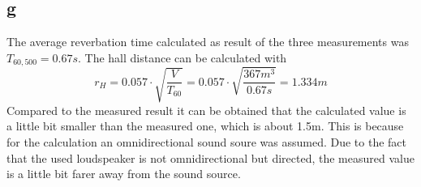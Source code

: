 \documentclass{article}
\begin{document}
\subsection{g}
The average reverbation time calculated as result of the three measurements was $T_{60,500}=0.67s$. The hall distance can be calculated with 
$$r_H=0.057\cdot\sqrt{\frac{V}{T_{60}}}=0.057\cdot\sqrt{\frac{367m^3}{0.67s}}=1.334m$$
Compared to the measured result it can be obtained that the calculated value is a little bit smaller than the measured one, which is about 1.5m. This is because for the calculation an omnidirectional sound soure was assumed. Due to the fact that the used loudspeaker is not omnidirectional but directed, the measured value is a little bit farer away from the sound source. 
\end{document}
